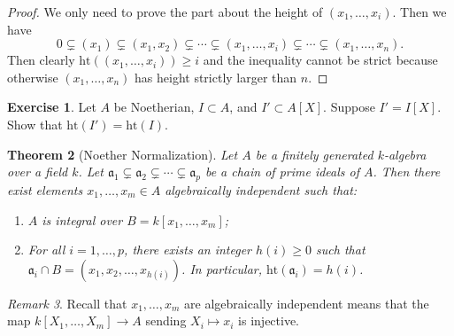 \documentclass[leqno, openany]{memoir}
\newtheorem{thm}{Theorem}[section]
\theoremstyle{definition}
\newtheorem{exer}[thm]{Exercise}
\theoremstyle{remark}
\newtheorem{rmk}[thm]{Remark}
\theoremstyle{plain}
\theoremstyle{definition}
\theoremstyle{remark}
\newcommand{\mf}[1]{\mathfrak{#1}}
\newcommand{\mr}[1]{\mathrm{#1}}
\begin{document}
\begin{proof} We only need to prove the part about the height of $(x_1, \ldots,
    x_i)$. Then we have \[ 0 \subsetneq (x_1) \subsetneq (x_1, x_2) \subsetneq
    \cdots \subsetneq (x_1, \ldots, x_i) \subsetneq \cdots \subsetneq (x_1,
\ldots, x_n). \] Then clearly $\mr{ht}((x_1, \ldots, x_i)) \geq i$ and the
inequality cannot be strict because otherwise $(x_1, \ldots, x_n)$ has height
strictly larger than $n$.  \end{proof}

\begin{exer} Let $A$ be Noetherian, $I \subset A$, and $I' \subset A[X]$.
Suppose $I' = I[X]$. Show that $\mr{ht}(I') = \mr{ht}(I)$.  \end{exer}

\begin{thm}[Noether Normalization] Let $A$ be a finitely generated $k$-algebra
    over a field $k$. Let $\mf{a}_1 \subsetneq \mf{a}_2 \subsetneq \cdots
    \subsetneq \mf{a}_p$ be a chain of prime ideals of $A$. Then there exist
    elements $x_1, \ldots, x_m \in A$ algebraically independent such that:
    \begin{enumerate} \item $A$ is integral over $B = k[x_1, \ldots, x_m]$;
        \item For all $i = 1, \ldots, p$, there exists an integer $h(i) \geq 0$
            such that $\mf{a}_i \cap B = (x_1, x_2, \ldots, x_{h(i)})$. In
            particular, $\mr{ht}(\mf{a}_i) = h(i)$.  \end{enumerate} \end{thm}

\begin{rmk} Recall that $x_1, \ldots, x_m$ are algebraically independent means
that the map $k[X_1, \ldots, X_m] \to A$ sending $X_i \mapsto x_i$ is
injective.  \end{rmk}
\end{document}
